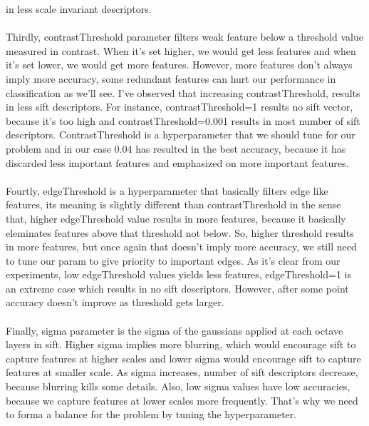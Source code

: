 \documentclass[12pt]{article}
\begin{document}
\begin{center}
        in less scale invariant descriptors.
        \\~\\
        Thirdly, contrastThreshold parameter filters weak feature below a threshold value measured in contrast.
        When it's set higher, we would get less features and when it's set lower, we would get more features.
        However, more features don't always imply more accuracy, some redundant features can hurt our performance in classification as we'll see.
        I've observed that increasing contrastThreshold, results in less sift descriptors. For instance, contrastThreshold=1 results no sift vector, because it's too high and contrastThreshold=0.001 results in most number of sift descriptors.
        ContrastThreshold is a hyperparameter that we should tune for our problem and in our case 0.04 has resulted in the best accuracy, because it has discarded less important features and emphasized on more important features.
        \\~\\
        Fourtly, edgeThreshold is a hyperparameter that basically filters edge like features, its meaning is slightly different than contrastThreshold in the sense that, higher edgeThreshold value results in more features, because it basically eleminates features above that threshold not below.
        So, higher threshold results in more features, but once again that doesn't imply more accuracy, we still need to tune our param to give priority to important edges.
        As it's clear from our experiments, low edgeThreshold values yields less features, edgeThreshold=1 is an extreme case which results in no sift descriptors. 
        However, after some point accuracy doesn't improve as threshold gets larger.
        \\~\\
        Finally, sigma parameter is the sigma of the gaussians applied at each octave layers in sift.
        Higher sigma implies more blurring, which would encourage sift to capture features at higher scales
        and lower sigma would encourage sift to capture features at smaller scale. 
        As sigma increases, number of sift descriptors decrease, because blurring kills some details.
        Also, low sigma values have low accuracies, because we capture features at lower scales more frequently.
        That's why we need to forma a balance for the problem by tuning the hyperparameter.
       


    \end{center}
\end{document}
